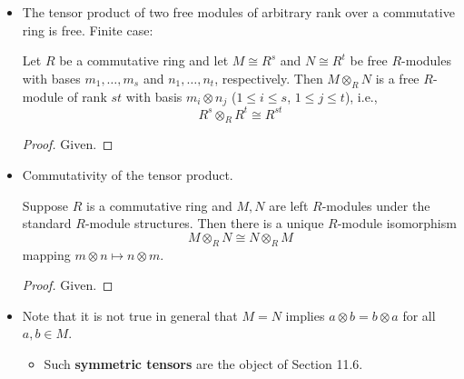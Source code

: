 \documentclass[../notes.tex]{subfiles}
\begin{document}
\begin{itemize}
    \begin{corollary}\label{cly:10.18}
        The module obtained from the free $R$-module $N\cong R^n$ by extension of scalars from $R$ to $S$ is the free $S$-module $S^n$, i.e.,
        \begin{equation*}
            S\otimes_RR^n \cong S^n
        \end{equation*}
        as left $S$-modules.
        \begin{proof}
            Given.
        \end{proof}
    \end{corollary}
    \item The tensor product of two free modules of arbitrary rank over a commutative ring is free. Finite case:
    \begin{corollary}\label{cly:10.19}
        Let $R$ be a commutative ring and let $M\cong R^s$ and $N\cong R^t$ be free $R$-modules with bases $m_1,\dots,m_s$ and $n_1,\dots,n_t$, respectively. Then $M\otimes_RN$ is a free $R$-module of rank $st$ with basis $m_i\otimes n_j$ ($1\leq i\leq s$, $1\leq j\leq t$), i.e.,
        \begin{equation*}
            R^s\otimes_RR^t \cong R^{st}
        \end{equation*}
        \begin{proof}
            Given.
        \end{proof}
    \end{corollary}
    \item Commutativity of the tensor product.
    \begin{proposition}\label{prp:10.20}
        Suppose $R$ is a commutative ring and $M,N$ are left $R$-modules under the standard $R$-module structures. Then there is a unique $R$-module isomorphism
        \begin{equation*}
            M\otimes_RN \cong N\otimes_RM
        \end{equation*}
        mapping $m\otimes n\mapsto n\otimes m$.
        \begin{proof}
            Given.
        \end{proof}
    \end{proposition}
    \item Note that it is not true in general that $M=N$ implies $a\otimes b=b\otimes a$ for all $a,b\in M$.
    \begin{itemize}
        \item Such \textbf{symmetric tensors} are the object of Section 11.6.

\end{itemize}
\end{itemize}
\end{document}
